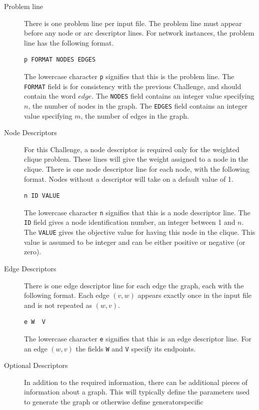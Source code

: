 \documentclass[a4paper,11pt]{report}
\begin{document}
{{{\begin{description}
\item[{ Problem line }]  There is one problem line per input file. The problem line must appear before
any node or arc descriptor lines. For network instances, the problem line has
the following format. 
\begin{Verbatim}[commandchars=!@|,fontsize=\small,frame=single,label=Example]
  p FORMAT NODES EDGES
\end{Verbatim}
 The lowercase character \texttt{p} signifies that this is the problem line. The \texttt{FORMAT} field is for consistency with the previous Challenge, and should contain the
word $edge$. The \texttt{NODES} field contains an integer value specifying $n$, the number of nodes in the graph. The \texttt{EDGES} field contains an integer value specifying $m$, the number of edges in the graph. 
\item[{Node Descriptors}]  For this Challenge, a node descriptor is required only for the weighted clique
problem. These lines will give the weight assigned to a node in the clique.
There is one node descriptor line for each node, with the following format.
Nodes without a descriptor will take on a default value of 1. 
\begin{Verbatim}[commandchars=!@|,fontsize=\small,frame=single,label=Example]
  n ID VALUE
\end{Verbatim}
 The lowercase character \texttt{n} signifies that this is a node descriptor line. The \texttt{ID} field gives a node identification number, an integer between 1 and $n$. The \texttt{VALUE} gives the objective value for having this node in the clique. This value is
assumed to be integer and can be either positive or negative (or zero). 
\item[{Edge Descriptors}]  There is one edge descriptor line for each edge the graph, each with the
following format. Each edge $(v,w)$ appears exactly once in the input file and is not repeated as $(w,v)$. 
\begin{Verbatim}[commandchars=!@|,fontsize=\small,frame=single,label=Example]
  e W  V
\end{Verbatim}
 The lowercase character \texttt{e} signifies that this is an edge descriptor line. For an edge $(w,v)$ the fields \texttt{W} and \texttt{V} specify its endpoints. 
\item[{Optional Descriptors}]  In addition to the required information, there can be additional pieces of
information about a graph. This will typically define the parameters used to
generate the graph or otherwise define generator\texttt{}specific

\end{description}}}}
\end{document}
